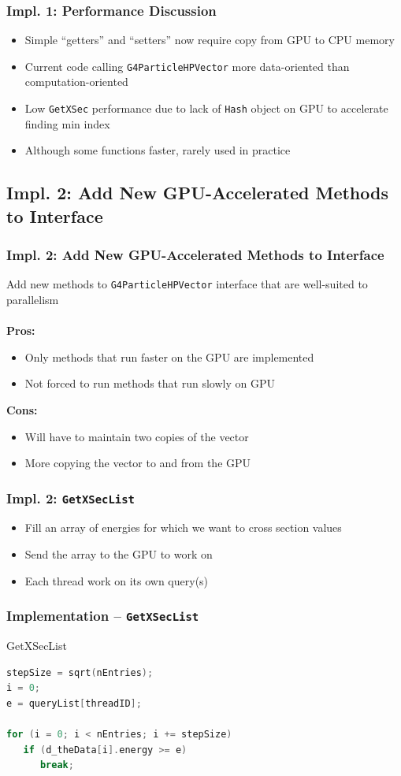 \documentclass{beamer}
\newcommand\pro{\item[$+$]}
\newcommand\con{\item[$-$]}
\begin{document}
\begin{frame}
\frametitle{Impl. 1: Performance Discussion}
\begin{itemize}
\item Simple ``getters'' and ``setters'' now require copy from GPU to CPU memory
\item Current code calling \texttt{G4ParticleHPVector} more data-oriented than computation-oriented
\item Low \texttt{GetXSec} performance due to lack of \texttt{Hash} object on GPU to accelerate finding min index
\item Although some functions faster, rarely used in practice
\end{itemize}
\end{frame}

\subsection{Impl. 2: Add New GPU-Accelerated Methods to Interface}
\begin{frame}
\frametitle{Impl. 2: Add New GPU-Accelerated Methods to Interface}
Add new methods to \texttt{G4ParticleHPVector} interface that are well-suited to parallelism\\~\\

\textbf{Pros:}
\begin{itemize}
\pro Only methods that run faster on the GPU are implemented
\pro Not forced to run methods that run slowly on GPU
\end{itemize}

\textbf{Cons:}
\begin{itemize}
\con Will have to maintain two copies of the vector
\con More copying the vector to and from the GPU
\end{itemize}
\end{frame}

\begin{frame}
\frametitle{Impl. 2: \texttt{GetXSecList}}
\begin{itemize}
\item Fill an array of energies for which we want to cross section values
\item Send the array to the GPU to work on
\item Each thread work on its own query(s)
\end{itemize}
\end{frame}

\begin{frame}[fragile]
\frametitle{Implementation -- \texttt{GetXSecList}}
\begin{block}{GetXSecList}
\begin{lstlisting}[language=C++,basicstyle=\ttfamily,keywordstyle=\color{red}]
stepSize = sqrt(nEntries);
i = 0;
e = queryList[threadID];
    
for (i = 0; i < nEntries; i += stepSize) 
   if (d_theData[i].energy >= e) 
      break;
\end{lstlisting}
\end{block}
\end{frame}
\end{document}
